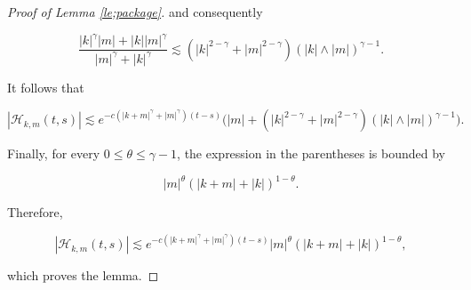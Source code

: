 \documentclass[10pt,a4paper]{amsart}
\newcommand{\ml}{\mathcal}
\begin{document}
\begin{proof}[Proof of Lemma \ref{le;package}]
and consequently

$$
\frac{|k|^\gamma|m|+|k||m|^\gamma}
{|m|^\gamma+|k|^\gamma}
\lesssim
(|k|^{2-\gamma}+|m|^{2-\gamma})
(|k|\wedge|m|)^{\gamma-1}.
$$

It follows that

$$
|\ml H_{k,m}(t,s)|
\lesssim
e^{-c(|k+m|^\gamma+|m|^\gamma)(t-s)}
\Big(
|m|+
(|k|^{2-\gamma}+|m|^{2-\gamma})
(|k|\wedge|m|)^{\gamma-1}
\Big).
$$

Finally, for every \(0\leq\theta\leq\gamma-1\), the expression in the parentheses is bounded by

$$
|m|^\theta(|k+m|+|k|)^{1-\theta}.
$$

Therefore,

$$
|\ml H_{k,m}(t,s)|
\lesssim
e^{-c(|k+m|^\gamma+|m|^\gamma)(t-s)}
|m|^\theta(|k+m|+|k|)^{1-\theta},
$$

which proves the lemma.
\end{proof}
\end{document}
